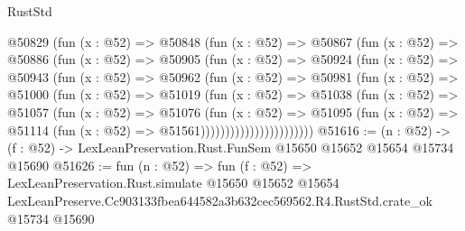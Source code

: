 \begin{lexlean}{RustStd}
\begin{coremodule}
                @50829
                  (fun (x : @52) =>
                  @50848
                    (fun (x : @52) =>
                    @50867
                      (fun (x : @52) =>
                      @50886
                        (fun (x : @52) =>
                        @50905
                          (fun (x : @52) =>
                          @50924
                            (fun (x : @52) =>
                            @50943
                              (fun (x : @52) =>
                              @50962
                                (fun (x : @52) =>
                                @50981
                                  (fun (x : @52) =>
                                  @51000
                                    (fun (x : @52) =>
                                    @51019
                                      (fun (x : @52) =>
                                      @51038
                                        (fun (x : @52) =>
                                        @51057
                                          (fun (x : @52) =>
                                          @51076
                                            (fun (x : @52) =>
                                            @51095
                                              (fun (x : @52) =>
                                              @51114 (fun (x : @52) => @51561)))))))))))))))))))))))
@51616 := (n : @52) ->
  (f : @52) -> LexLeanPreservation.Rust.FunSem @15650 @15652 @15654 @15734 @15690
@51626 := fun (n : @52) =>
  fun (f : @52) =>
  LexLeanPreservation.Rust.simulate
    @15650
    @15652
    @15654
    LexLeanPreserve.Cc903133fbea644582a3b632cec569562.R4.RustStd.crate_ok
    @15734
    @15690
\end{coremodule}
\end{lexlean}

